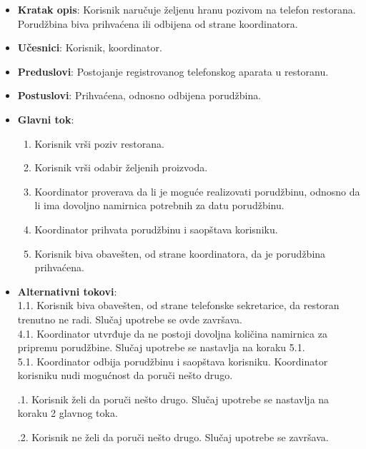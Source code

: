 \begin{itemize}
    \item \textbf{Kratak opis}: Korisnik naručuje željenu hranu pozivom na telefon restorana. Porudžbina biva prihvaćena ili odbijena od strane koordinatora.
    \item \textbf{Učesnici}: Korisnik, koordinator.
    \item \textbf{Preduslovi}: Postojanje registrovanog telefonskog aparata u restoranu.
    \item \textbf{Postuslovi}: Prihvaćena, odnosno odbijena porudžbina.
     \item \textbf{Glavni tok}:
    \begin{enumerate}
        \item Korisnik vrši poziv restorana.
        \item Korisnik vrši odabir željenih proizvoda.
        \item Koordinator proverava da li je moguće realizovati porudžbinu, odnosno
        da li ima dovoljno namirnica potrebnih za datu porudžbinu.
        \item Koordinator prihvata porudžbinu i saopštava korisniku.
        \item Korisnik biva obavešten, od strane koordinatora, da je porudžbina prihvaćena.
    \end{enumerate}
    \item \textbf{Alternativni tokovi}:\\
     1.1. Korisnik biva obavešten, od strane telefonske sekretarice, da restoran trenutno ne radi. Slučaj upotrebe se ovde završava.\\
     4.1. Koordinator utvrđuje da ne postoji dovoljna količina namirnica za pripremu porudžbine. Slučaj upotrebe se nastavlja na koraku 5.1.\\
     5.1. Koordinator odbija porudžbinu i saopštava korisniku. Koordinator korisniku nudi mogućnost da poruči nešto drugo.  
     
      .1. Korisnik želi da poruči nešto drugo. Slučaj upotrebe se nastavlja na koraku 2 glavnog toka. 
      
      .2. Korisnik ne želi da poruči nešto drugo. Slučaj upotrebe se završava. \\
    
     
\end{itemize}

\newpage
